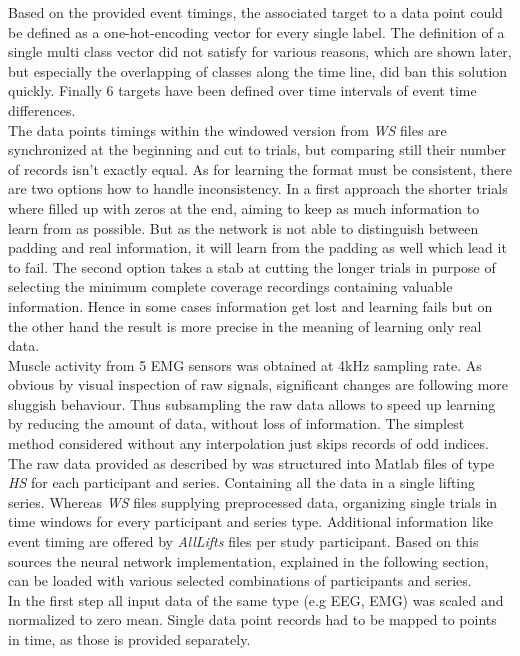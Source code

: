 \documentclass{article} %
\begin{document}
Based on the provided event timings, the associated target to a data point could be defined as a one-hot-encoding vector for every single label. The definition of a single multi class vector did not satisfy for various reasons, which are shown later, but especially the overlapping of classes along the time line, did ban this solution quickly. Finally 6 targets have been defined over time intervals of event time differences. \\The data points timings within the windowed version from \textit{WS} files are synchronized at the beginning and cut to trials, but comparing still their number of records isn't exactly equal. As for learning the format must be consistent, there are two options how to handle inconsistency. In a first approach the shorter trials where filled up with zeros at the end, aiming to keep as much information to learn from as possible. But as the network is not able to distinguish between padding and real information, it will learn from the padding as well which lead it to fail. The second option takes a stab at cutting the longer trials in purpose of selecting the minimum complete coverage recordings containing valuable information. Hence in some cases information get lost and learning fails but on the other hand the result is more precise in the meaning of learning only real data.\\ Muscle activity from 5 EMG sensors was obtained at 4kHz sampling rate. As obvious by visual inspection of raw signals, significant changes are following more sluggish behaviour. Thus subsampling the raw data allows to speed up learning by reducing the amount of data, without loss of information. The simplest method considered without any interpolation just skips records of odd indices. \\
The raw data provided as described by \cite{nature} was structured into Matlab files of type \textit{HS} for each participant and series. Containing all the data in a single lifting series. Whereas \textit{WS} files supplying preprocessed data, organizing single trials in time windows for every participant and series type. Additional information like event timing are offered by \textit{AllLifts} files per study participant. Based on this sources the neural network implementation, explained in the following section, can be loaded with various selected combinations of participants and series.\\ In the first step all input data of the same type (e.g EEG, EMG) was scaled and normalized to zero mean. Single data point records had to be mapped to points in time, as those is provided separately.\\
\end{document}
